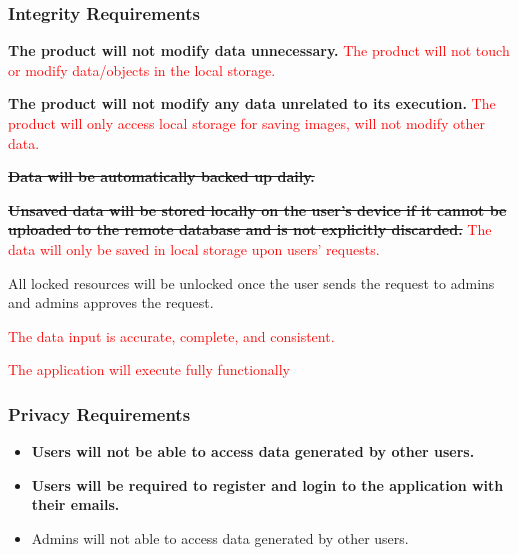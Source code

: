 \documentclass{article}
\newcounter{irreqnum} %
\newcounter{prrreqnum} %
\begin{document}
\subsubsection{Integrity Requirements}
\begin{itemize}
    \item[IR\refstepcounter{irreqnum}\theirreqnum \label{R_Inputs}:] \textbf{The product will not modify data unnecessary.}
    \textcolor{red}{The product will not touch or modify data/objects in the local storage.}
    \item[IR\refstepcounter{irreqnum}\theirreqnum \label{R_Inputs}:] \textbf{The product will not modify any data unrelated to its execution.}
    \textcolor{red}{The product will only access local storage for saving images, will not modify other data.}
    \item[IR\refstepcounter{irreqnum}\theirreqnum \label{R_Inputs}:] \sout{\textbf{Data will be automatically backed up daily.}}
    \item[IR\refstepcounter{irreqnum}\theirreqnum \label{R_Inputs}:] \sout{\textbf{Unsaved data will be stored locally on the user's device if it cannot be uploaded to the remote database and is not explicitly discarded.}}
    \textcolor{red}{The data will only be saved in local storage upon users' requests.}
    \item[IR\refstepcounter{irreqnum}\theirreqnum \label{R_Inputs}:] All locked resources will be unlocked once the user sends the request to admins and admins approves the request.
    \textcolor{red}{
    \item[IR\refstepcounter{irreqnum}\theirreqnum
    \label{R_Inputs}:] The data input is accurate, complete, and consistent.
    \item[IR\refstepcounter{irreqnum}\theirreqnum
    \label{R_Inputs}:] The application will execute fully functionally}
    
\end{itemize}

\subsubsection{Privacy Requirements}
\begin{itemize}
    \item[PRR\refstepcounter{prrreqnum}\theprrreqnum \label{R_Inputs}:] \textbf{Users will not be able to access data generated by other users.}
    \item[PRR\refstepcounter{prrreqnum}\theprrreqnum \label{R_Inputs}:] \textbf{Users will be required to register and login to the application with their emails.}
    \item[PRR\refstepcounter{prrreqnum}\theprrreqnum \label{R_Inputs}:] Admins will not able to access data generated by other users.
\end{itemize}
\end{document}
